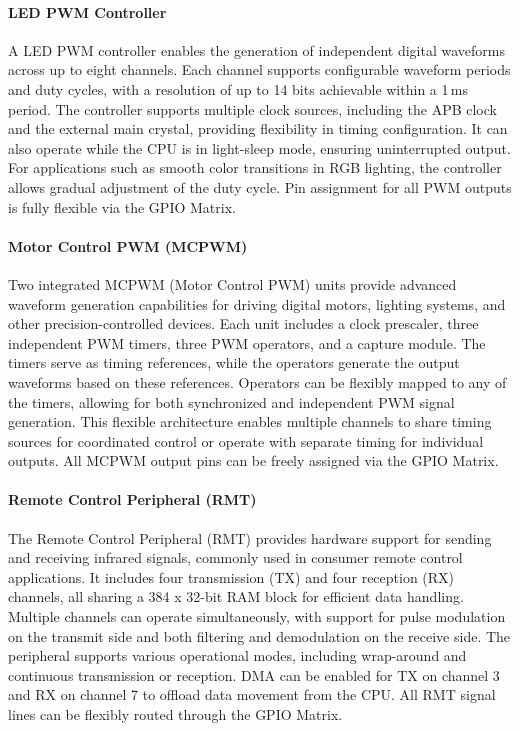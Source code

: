 \paragraph{LED PWM Controller}
A LED PWM controller enables the generation of independent digital waveforms across up to eight channels. Each channel supports configurable waveform periods and duty cycles, with a resolution of up to 14 bits achievable within a 1\,ms period. The controller supports multiple clock sources, including the APB clock and the external main crystal, providing flexibility in timing configuration. It can also operate while the CPU is in light-sleep mode, ensuring uninterrupted output. For applications such as smooth color transitions in RGB lighting, the controller allows gradual adjustment of the duty cycle. Pin assignment for all PWM outputs is fully flexible via the GPIO Matrix.

\paragraph{Motor Control PWM (MCPWM)}
Two integrated MCPWM (Motor Control PWM) units provide advanced waveform generation capabilities for driving digital motors, lighting systems, and other precision-controlled devices. Each unit includes a clock prescaler, three independent PWM timers, three PWM operators, and a capture module. The timers serve as timing references, while the operators generate the output waveforms based on these references. Operators can be flexibly mapped to any of the timers, allowing for both synchronized and independent PWM signal generation. This flexible architecture enables multiple channels to share timing sources for coordinated control or operate with separate timing for individual outputs. All MCPWM output pins can be freely assigned via the GPIO Matrix.

\paragraph{Remote Control Peripheral (RMT)}
The Remote Control Peripheral (RMT) provides hardware support for sending and receiving infrared signals, commonly used in consumer remote control applications. It includes four transmission (TX) and four reception (RX) channels, all sharing a 384 x 32-bit RAM block for efficient data handling. Multiple channels can operate simultaneously, with support for pulse modulation on the transmit side and both filtering and demodulation on the receive side. The peripheral supports various operational modes, including wrap-around and continuous transmission or reception. DMA can be enabled for TX on channel 3 and RX on channel 7 to offload data movement from the CPU. All RMT signal lines can be flexibly routed through the GPIO Matrix.


